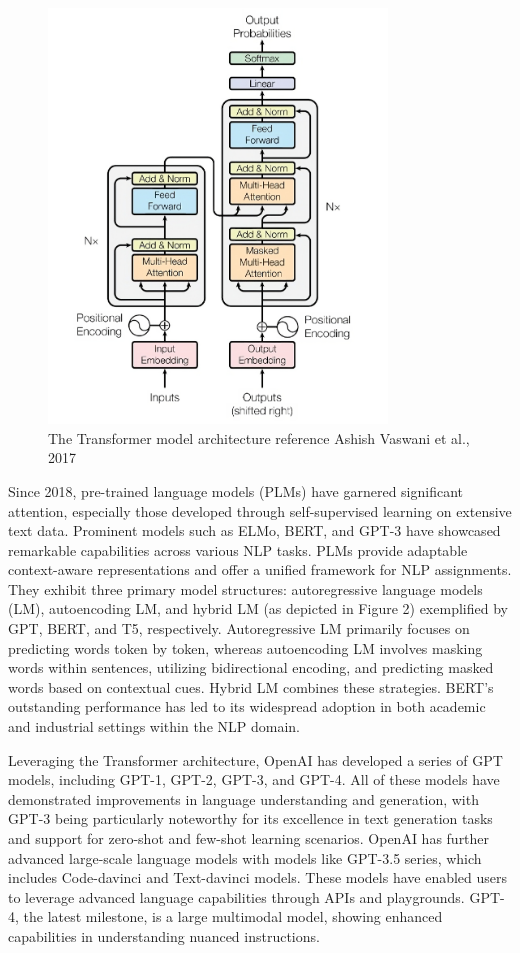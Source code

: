 \documentclass[fleqn,10pt]{thescipub} %
\begin{document}
\begin{figure}[htp]
    \includegraphics[width=9cm]{transformer}
    \caption{The Transformer model architecture reference Ashish Vaswani et al., 2017}
    \label{fig:galaxy}
\end{figure}



Since 2018, pre-trained language models (PLMs) have garnered significant attention, especially those developed through self-supervised learning on extensive text data. Prominent models such as ELMo, BERT, and GPT-3 have showcased remarkable capabilities across various NLP tasks. PLMs provide adaptable context-aware representations and offer a unified framework for NLP assignments. They exhibit three primary model structures: autoregressive language models (LM), autoencoding LM, and hybrid LM (as depicted in Figure 2) exemplified by GPT, BERT, and T5, respectively. Autoregressive LM primarily focuses on predicting words token by token, whereas autoencoding LM involves masking words within sentences, utilizing bidirectional encoding, and predicting masked words based on contextual cues. Hybrid LM combines these strategies. BERT's outstanding performance has led to its widespread adoption in both academic and industrial settings within the NLP domain.

Leveraging the Transformer architecture, OpenAI has developed a series of GPT models, including GPT-1, GPT-2, GPT-3, and GPT-4. All of these models have demonstrated improvements in language understanding and generation, with GPT-3 being particularly noteworthy for its excellence in text generation tasks and support for zero-shot and few-shot learning scenarios. OpenAI has further advanced large-scale language models with models like GPT-3.5 series, which includes Code-davinci and Text-davinci models. These models have enabled users to leverage advanced language capabilities through APIs and playgrounds. GPT-4, the latest milestone, is a large multimodal model, showing enhanced capabilities in understanding nuanced instructions.
\end{document}
